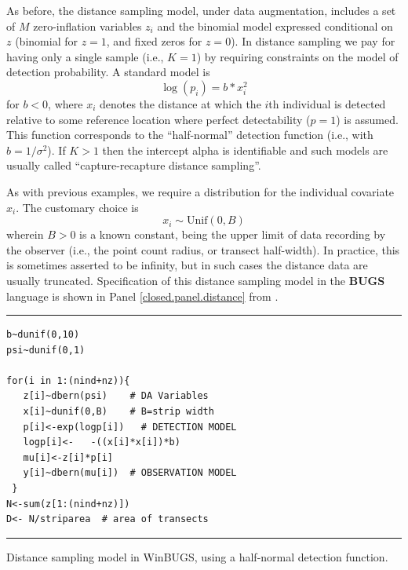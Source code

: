 As before, the distance sampling model, under data augmentation,
includes a set of $M$ zero-inflation variables $z_{i}$ and the
binomial model expressed conditional on $z$ (binomial for $z=1$, and
fixed zeros for $z=0$).  In distance sampling we pay for having only a
single sample (i.e., $K=1$) by requiring constraints on the model of
detection probability. A standard model is
\[
\log(p_{i}) = b * x_{i}^{2}
\]
for $b < 0$, where $x_i$ denotes the distance at which the $i$th
individual is detected relative to some reference location where
perfect detectability ($p=1$) is assumed. This function corresponds to
the ``half-normal'' detection function (i.e., with $b =
1/\sigma^{2}$).  If $K>1$ then the intercept alpha is identifiable and
such models are usually called ``capture-recapture distance
sampling''\citep{alpizar_pollock:1996,borchers_etal:1998}.

As with previous examples, we require a distribution for the individual covariate $x_{i}$. The customary choice is
\[
x_{i} \sim \mbox{Unif}(0,B)
\]
wherein $B>0$ is a known constant, being the upper limit of data
recording by the observer (i.e., the point count radius, or transect
half-width). In practice, this is sometimes asserted to be infinity,
but in such cases the distance data are usually truncated.
Specification of this distance sampling model in the {\bf BUGS} language is
shown in Panel \ref{closed.panel.distance} from \citet{royle_dorazio:2008}.


\begin{panel}[htp]
\centering
\rule[0.15in]{\textwidth}{.03in}
\begin{minipage}{5in}
\begin{verbatim}
b~dunif(0,10)
psi~dunif(0,1)

for(i in 1:(nind+nz)){
   z[i]~dbern(psi)    # DA Variables
   x[i]~dunif(0,B)    # B=strip width
   p[i]<-exp(logp[i])   # DETECTION MODEL
   logp[i]<-   -((x[i]*x[i])*b)
   mu[i]<-z[i]*p[i]
   y[i]~dbern(mu[i])  # OBSERVATION MODEL
 }
N<-sum(z[1:(nind+nz)])
D<- N/striparea  # area of transects
\end{verbatim}
\end{minipage}
\rule[-0.15in]{\textwidth}{.03in}
\caption{Distance sampling model in WinBUGS, using a half-normal
detection function.}
\label{closed.panel.distance}
\end{panel}

